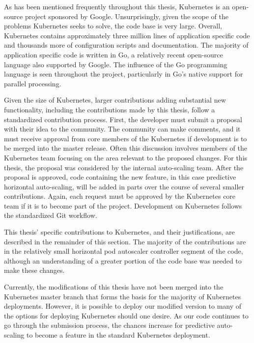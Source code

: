 As has been mentioned frequently throughout this thesis, Kubernetes is an
open-source project sponsored by Google. Unsurprisingly, given the scope of the
problems Kubernetes seeks to solve, the code base is very large. Overall,
Kubernetes contains approximately three million lines of application specific
code and thousands more of configuration scripts and documentation. The majority
of application specific code is written in Go, a relatively recent open-source
language also supported by Google. The influence of the Go programming language
is seen throughout the project, particularly in Go's native support for parallel
processing.

Given the size of Kubernetes, larger contributions adding substantial new functionality,
including the contributions made by this thesis, follow a standardized contribution process.
First, the developer must submit a proposal with their idea to the community.
The community can make comments, and it must receive approval from core members
of the Kubernetes if development is to be merged into the master release. Often
this discussion involves members of the Kubernetes team focusing on the area
relevant to the proposed changes. For this thesis, the proposal was considered
by the internal auto-scaling team. After the proposal is approved, code
containing the new feature, in this case predictive horizontal auto-scaling,
will be added in parts over the course of several smaller contributions. Again,
each request must be approved by the Kubernetes core team if it is to become
part of the project. Development on Kubernetes follows the standardized Git workflow.

This thesis' specific contributions to Kubernetes, and their justifications,
are described in the remainder of this section. The majority of the
contributions are in the relatively small horizontal pod autoscaler controller
segment of the code, although an understanding of a greater portion of the code
base was needed to make these changes.

Currently, the modifications of this thesis have not been merged into the
Kubernetes master branch that forms the basis for the majority of Kubernetes
deployments. However, it is possible to deploy our modified version to many of
the options for deploying Kubernetes should one desire. As our code continues to
go through the submission process, the chances increase for predictive
auto-scaling to become a feature in the standard Kubernetes deployment.
